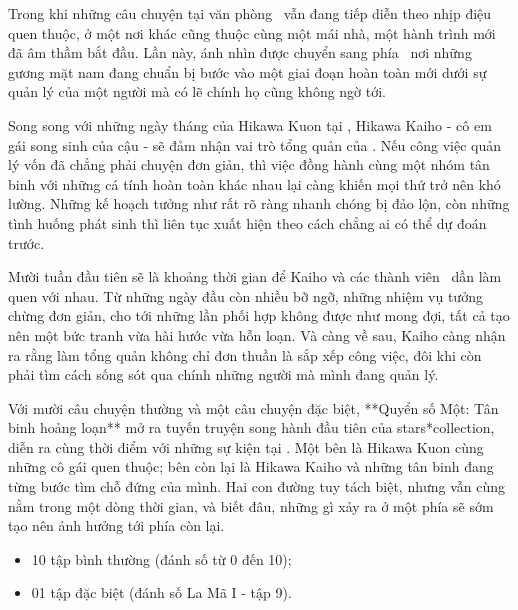 \documentclass[main.tex]{subfiles}
\begin{document}
Trong khi những câu chuyện tại văn phòng \hll\ vẫn đang tiếp diễn theo nhịp điệu quen thuộc, ở một nơi khác cũng thuộc cùng một mái nhà, một hành trình mới đã âm thầm bắt đầu. Lần này, ánh nhìn được chuyển sang phía \hls\ nơi những gương mặt nam đang chuẩn bị bước vào một giai đoạn hoàn toàn mới dưới sự quản lý của một người mà có lẽ chính họ cũng không ngờ tới.

Song song với những ngày tháng của Hikawa Kuon tại \hll, Hikawa Kaiho - cô em gái song sinh của cậu - sẽ đảm nhận vai trò tổng quản của \hls. Nếu công việc quản lý vốn đã chẳng phải chuyện đơn giản, thì việc đồng hành cùng một nhóm tân binh với những cá tính hoàn toàn khác nhau lại càng khiến mọi thứ trở nên khó lường. Những kế hoạch tưởng như rất rõ ràng nhanh chóng bị đảo lộn, còn những tình huống phát sinh thì liên tục xuất hiện theo cách chẳng ai có thể dự đoán trước.

Mười tuần đầu tiên sẽ là khoảng thời gian để Kaiho và các thành viên \hls\ dần làm quen với nhau. Từ những ngày đầu còn nhiều bỡ ngỡ, những nhiệm vụ tưởng chừng đơn giản, cho tới những lần phối hợp không được như mong đợi, tất cả tạo nên một bức tranh vừa hài hước vừa hỗn loạn. Và càng về sau, Kaiho càng nhận ra rằng làm tổng quản không chỉ đơn thuần là sắp xếp công việc, đôi khi còn phải tìm cách sống sót qua chính những người mà mình đang quản lý.

Với mười câu chuyện thường và một câu chuyện đặc biệt, **Quyển số Một: Tân binh hoảng loạn** mở ra tuyến truyện song hành đầu tiên của stars*collection, diễn ra cùng thời điểm với những sự kiện tại \hll. Một bên là Hikawa Kuon cùng những cô gái quen thuộc; bên còn lại là Hikawa Kaiho và những tân binh đang từng bước tìm chỗ đứng của mình. Hai con đường tuy tách biệt, nhưng vẫn cùng nằm trong một dòng thời gian, và biết đâu, những gì xảy ra ở một phía sẽ sớm tạo nên ảnh hưởng tới phía còn lại.

{}
\begin{itemize}
\item 10 tập bình thường (đánh số từ 0 đến 10);
\item 01 tập đặc biệt (đánh số La Mã I - tập 9).
\end{itemize}
\end{document}
